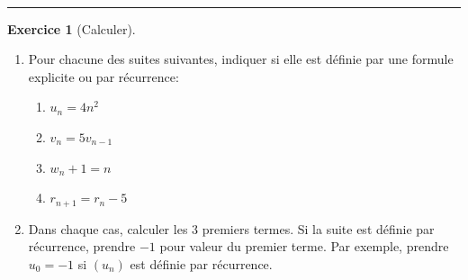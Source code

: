 \documentclass{exam}
\theoremstyle{definition}
\newtheorem{exercice}{Exercice}
\begin{document}
\Large

\vspace{5mm}

\begin{center}
\end{center}

~\\



\medskip\hrule

\begin{exercice}[Calculer]
    \begin{enumerate}
    \item Pour chacune des suites suivantes, indiquer si elle est définie par une formule explicite ou par récurrence:
    \begin{enumerate}
        \item $u_n = 4n^2$
        
        \hrulefill
        \item $v_{n} = 5v_{n-1}$

        \hrulefill
        \item $w_{n} + 1 = n$
        
        \hrulefill
        \item $r_{n+1} = r_n - 5$

        \hrulefill
    \end{enumerate}
    
    \item Dans chaque cas, calculer les 3 premiers termes. Si la suite est définie par récurrence, prendre $-1$ pour valeur du premier terme. Par exemple, prendre $u_0 = -1$ si $(u_n)$ est définie par récurrence.%
    \end{enumerate}
    \begin{center}
    \end{center}


\end{exercice}
\end{document}
